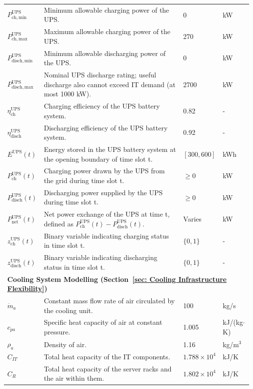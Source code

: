 \documentclass[lettersize,journal]{IEEEtran}
\begin{document}
{{\begin{longtable}{p{} p{} p{} p{}}
$P^{\mathrm{UPS}}_{\mathrm{ch,min}}$ & Minimum allowable charging power of the UPS. & 0 &kW \\
$P^{\mathrm{UPS}}_{\mathrm{ch,max}}$ & Maximum allowable charging power of the UPS. & 270 &kW \\
$P^{\mathrm{UPS}}_{\mathrm{disch,min}}$ & Minimum allowable discharging power of the UPS. & 0 &kW \\
$P^{\mathrm{UPS}}_{\mathrm{disch,max}}$ & Nominal UPS discharge rating; useful discharge also cannot exceed IT demand (at most 1000 kW). & 2700 &kW \\
$\eta^{\mathrm{UPS}}_{\mathrm{ch}}$ & Charging efficiency of the UPS battery system. & 0.82 & - \\
$\eta^{\mathrm{UPS}}_{\mathrm{disch}}$ & Discharging efficiency of the UPS battery system. & 0.92 & - \\
$E^{\mathrm{UPS}}(t)$ & Energy stored in the UPS battery system at the opening boundary of time slot t. & $[300, 600]$ &kWh \\
$P^{\mathrm{UPS}}_{\mathrm{ch}}(t)$ & Charging power drawn by the UPS from the grid during time slot t. & $\geq 0$ &kW \\
$P^{\mathrm{UPS}}_{\mathrm{disch}}(t)$ & Discharging power supplied by the UPS during time slot t. & $\geq 0$ &kW \\
$P^{\mathrm{UPS}}_{\mathrm{net}}(t)$ & Net power exchange of the UPS at time t, defined as $P^{\mathrm{UPS}}_{\mathrm{ch}}(t) - P^{\mathrm{UPS}}_{\mathrm{disch}}(t)$. & Varies &kW \\
$z^{\mathrm{UPS}}_{\mathrm{ch}}(t)$ & Binary variable indicating charging status in time slot t. & $\{0, 1\}$ & - \\
$z^{\mathrm{UPS}}_{\mathrm{disch}}(t)$ & Binary variable indicating discharging status in time slot t. & $\{0, 1\}$ & - \\
\midrule
\multicolumn{4}{l}{\textbf{Cooling System Modelling (Section~\ref{sec: Cooling Infrastructure Flexibility})}} \\
\midrule
$\dot{m}_a$ & Constant mass flow rate of air circulated by the cooling unit. & 100 & kg/s \\
$c_{pa}$ & Specific heat capacity of air at constant pressure. & 1.005 & kJ/(kg$\cdot$K) \\
$\rho_a$ & Density of air. & 1.16 & kg/m$^3$ \\
$C_{IT}$ & Total heat capacity of the IT components. & $1.788 \times 10^4$ & kJ/K \\
$C_R$ & Total heat capacity of the server racks and the air within them. & $1.802 \times 10^4$ & kJ/K \\

\end{longtable}}}
\end{document}
